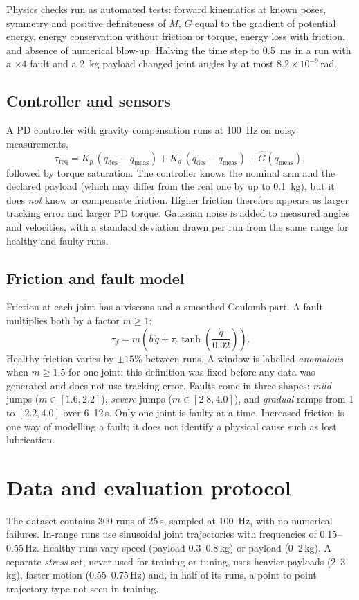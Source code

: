 \documentclass[11pt,a4paper]{article}
\begin{document}
Physics checks run as automated tests: forward kinematics at known poses, symmetry and positive definiteness of $M$,
$G$ equal to the gradient of potential energy, energy conservation without friction or torque, energy loss with
friction, and absence of numerical blow-up. Halving the time step to \SI{0.5}{ms} in a run with a $\times4$ fault and
a \SI{2}{kg} payload changed joint angles by at most $8.2\times10^{-9}$\,rad.

\subsection{Controller and sensors}
A PD controller with gravity compensation runs at \SI{100}{Hz} on noisy measurements,
\begin{equation}
  \tau_{\text{req}} = K_p\,(q_{\text{des}} - q_{\text{meas}}) + K_d\,(\dot q_{\text{des}} - \dot q_{\text{meas}})
  + \hat G(q_{\text{meas}}),
\end{equation}
followed by torque saturation. The controller knows the nominal arm and the declared payload (which may differ from
the real one by up to \SI{0.1}{kg}), but it does \emph{not} know or compensate friction. Higher friction therefore
appears as larger tracking error and larger PD torque. Gaussian noise is added to measured angles and velocities,
with a standard deviation drawn per run from the same range for healthy and faulty runs.

\subsection{Friction and fault model}
Friction at each joint has a viscous and a smoothed Coulomb part. A fault multiplies both by a factor $m\geq1$:
\begin{equation}
  \tau_f = m\left(b\,\dot q + \tau_c \tanh\!\left(\frac{\dot q}{0.02}\right)\right).
\end{equation}
Healthy friction varies by $\pm15\%$ between runs. A window is labelled \emph{anomalous} when $m\geq1.5$ for one
joint; this definition was fixed before any data was generated and does not use tracking error. Faults come in three
shapes: \emph{mild} jumps ($m\in[1.6,2.2]$), \emph{severe} jumps ($m\in[2.8,4.0]$), and \emph{gradual} ramps from 1 to
$[2.2,4.0]$ over 6--12\,s. Only one joint is faulty at a time. Increased friction is one way of modelling a fault; it
does not identify a physical cause such as lost lubrication.

\section{Data and evaluation protocol}
The dataset contains 300 runs of 25\,s, sampled at \SI{100}{Hz}, with no numerical failures. In-range runs use
sinusoidal joint trajectories with frequencies of 0.15--0.55\,Hz. Healthy runs vary speed (payload 0.3--0.8\,kg) or
payload (0--2\,kg). A separate \emph{stress} set, never used for training or tuning, uses heavier payloads (2--3\,kg),
faster motion (0.55--0.75\,Hz) and, in half of its runs, a point-to-point trajectory type not seen in training.
\end{document}
